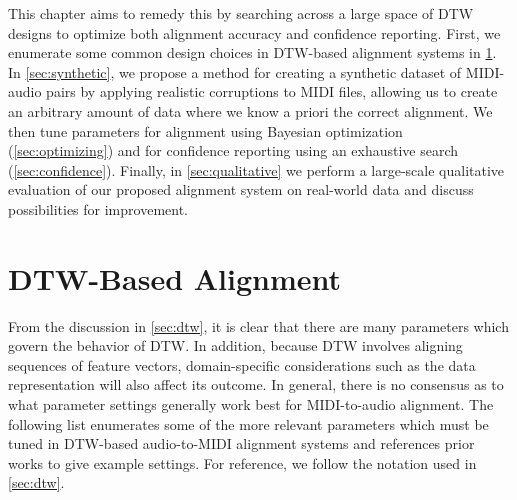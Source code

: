 This chapter aims to remedy this by searching across a large space of DTW designs to optimize both alignment accuracy and confidence reporting.
First, we enumerate some common design choices in DTW-based alignment systems in \cref{sec:dtw_parameters}.
In \cref{sec:synthetic}, we propose a method for creating a synthetic dataset of MIDI-audio pairs by applying realistic corruptions to MIDI files, allowing us to create an arbitrary amount of data where we know a priori the correct alignment.
We then tune parameters for alignment using Bayesian optimization (\cref{sec:optimizing}) and for confidence reporting using an exhaustive search (\cref{sec:confidence}).
Finally, in \cref{sec:qualitative} we perform a large-scale qualitative evaluation of our proposed alignment system on real-world data and discuss possibilities for improvement.

\section{DTW-Based Alignment}
\label{sec:dtw_parameters}

From the discussion in \cref{sec:dtw}, it is clear that there are many parameters which govern the behavior of DTW.
In addition, because DTW involves aligning sequences of feature vectors, domain-specific considerations such as the data representation will also affect its outcome.
In general, there is no consensus as to what parameter settings generally work best for MIDI-to-audio alignment.
The following list enumerates some of the more relevant parameters which must be tuned in DTW-based audio-to-MIDI alignment systems and references prior works to give example settings.
For reference, we follow the notation used in \cref{sec:dtw}.


